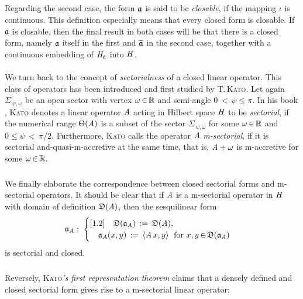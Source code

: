 \documentclass[11pt,twoside]{article}
\begin{document}
\subparagraph{} 
Regarding the second case,
the form $\mathfrak{a}$ is said to be \textit{closable},
if the mapping $\iota$ is continuous.
This definition especially means that every closed form is closable.
If $\mathfrak{a}$ is closable,
then the final result in both cases will be
that there is a closed form,
namely $\mathfrak{a}$ itself in the first and $\overline{\mathfrak{a}}$ in the second case,
together with a continuous embedding of $\mathit{H}_{\mathfrak{a}}$ into $\mathit{H}$.

\paragraph{} %
We turn back to the concept of \textit{sectorialness}
of a closed linear operator.
This class of operators has been introduced and first studied
by \textsc{T.\,Kato}.
Let again $\Sigma_{\,\psi,\omega}$ be an open sector
with vertex $\omega {\,\in\,} {\mathbb{R}}$ and semi-angle $0 {\,<\,} \psi \leq \pi$.
In his book \cite{Ka},
\textsc{Kato} denotes a linear operator $\mathit{A}$ acting in Hilbert space $\mathit{H}$
to be \textit{sectorial},
if the numerical range $\Theta(\mathit{A})$ is a subset of the sector
$\Sigma_{\,\psi,\omega}$
for some $\omega {\,\in\,} {\mathbb{R}}$ and $0 \leq \psi {\,<\,} \pi/2$.
Furthermore,
\textsc{Kato} calls the operator $\mathit{A}$ \textit{m-sectorial},
if it is sectorial and-quasi-m-accretive at the same time,
that is,
$\mathit{A} + \omega$ is m-accretive for some $\omega {\,\in\,} {\mathbb{R}}$.

\subparagraph{} %
We finally elaborate the correspondence
between closed sectorial forms and m-sectorial operators.
It should be clear
that if $\mathit{A}$ is a m-sectorial operator in $\mathit{H}$
with domain of definition $\mathfrak{D}(\mathit{A})$,
then the sesquilinear form
\[
\mathfrak{a}_{\mathit{A}}: \;
\begin{cases}[1.2]
\quad \mathfrak{D}(\mathfrak{a}_{\mathit{A}}) \,:=\, \mathfrak{D}(\mathit{A}), \\
\quad \mathfrak{a}_{\mathit{A}}(x,y)     \,:=\, \langle \mathit{A} \,x,y \rangle
\; \mbox{ for } x,y {\,\in\,} \mathfrak{D}(\mathfrak{a}_{\mathit{A}}) \\
\end{cases}
\]
is sectorial and closed.

\subparagraph{} %
Reversely,
\textsc{Kato}\textit{'s first representation theorem} claims that
a densely defined and closed sectorial form gives rise
to a m-sectorial linear operator:
\end{document}
